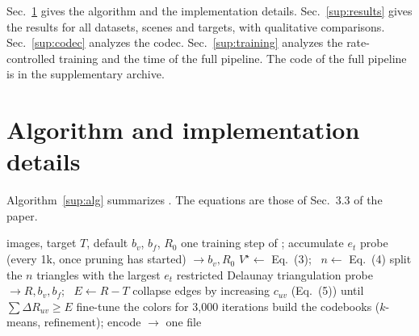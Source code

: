 \appendix
\setcounter{table}{0}
\setcounter{figure}{0}
\setcounter{equation}{0}
\setcounter{algorithm}{0}
\providecommand{\MipNeRF}{\emph{Mip-NeRF~360}\xspace}
\providecommand{\TandT}{\emph{Tanks and Temples}\xspace}
\providecommand{\DeepBlending}{\emph{Deep Blending}\xspace}
\providecommand{\NeRFSyn}{\emph{NeRF-Synthetic}\xspace}

Sec.~\ref{sup:impl} gives the algorithm and the implementation details. Sec.~\ref{sup:results} gives the results for all datasets, scenes and targets, with qualitative comparisons. Sec.~\ref{sup:codec} analyzes the codec. Sec.~\ref{sup:training} analyzes the rate-controlled training and the time of the full pipeline. The code of the full pipeline is in the supplementary archive.

\section{Algorithm and implementation details}
\label{sup:impl}

Algorithm~\ref{sup:alg} summarizes \BM. The equations are those of Sec.~3.3 of the paper.

\begin{algorithm}[h]
\caption{\BM for a target file size $T$}
\label{sup:alg}
\small
\begin{algorithmic}[1]
\Require images, target $T$, default $b_v$, $b_f$, $R_0$
  \State one training step of \MS; accumulate $e_t$
    \State probe (every 1k, once pruning has started) $\rightarrow b_v, R_0$
    \State $V^\star \gets$ Eq.~(3); \ $n \gets$ Eq.~(4)
    \State split the $n$ triangles with the largest $e_t$
  \EndIf
   restricted Delaunay triangulation \EndIf
    \State probe $\rightarrow R, b_v, b_f$; \ $E \gets R - T$
      \State collapse edges by increasing $c_{uv}$ (Eq.~(5)) until $\sum \Delta R_{uv} \ge E$
    \EndIf
  \EndIf
\EndFor
\State fine-tune the colors for 3{,}000 iterations
\State build the codebooks ($k$-means, refinement); encode $\rightarrow$ one file
\end{algorithmic}
\end{algorithm}

